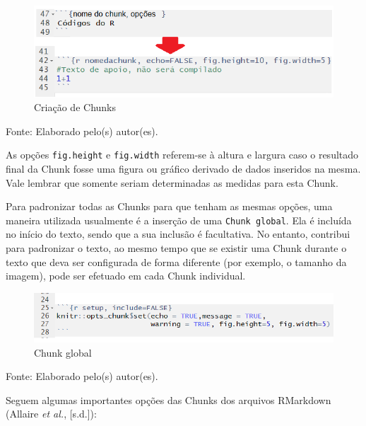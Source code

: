 \documentclass[12pt,brazil,oneside]{book}
\begin{document}
\begin{figure}[H]

{\centering \includegraphics[width=0.7\linewidth]{rmarkchunk2} 

}

\caption{Criação de Chunks}\label{fig:rmarkchunk2}
\end{figure}

Fonte: Elaborado pelo(s) autor(es).

As opções \texttt{fig.height} e \texttt{fig.width} referem-se à altura e largura caso o resultado final da Chunk fosse uma figura ou gráfico derivado de dados inseridos na mesma. Vale lembrar que somente seriam determinadas as medidas para esta Chunk.

Para padronizar todas as Chunks para que tenham as mesmas opções, uma maneira utilizada usualmente é a inserção de uma \texttt{Chunk\ global}. Ela é incluída no início do texto, sendo que a sua inclusão é facultativa. No entanto, contribui para padronizar o texto, ao mesmo tempo que se existir uma Chunk durante o texto que deva ser configurada de forma diferente (por exemplo, o tamanho da imagem), pode ser efetuado em cada Chunk individual.

\begin{figure}[H]

{\centering \includegraphics[width=0.7\linewidth]{rmarkchunkopt} 

}

\caption{Chunk global}\label{fig:rmarkchunkopt}
\end{figure}

Fonte: Elaborado pelo(s) autor(es).

Seguem algumas importantes opções das Chunks dos arquivos RMarkdown (Allaire \emph{et al.}, {[}s.d.{]}):
\end{document}
